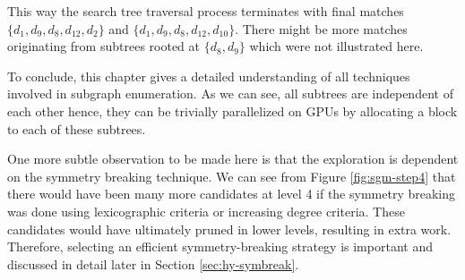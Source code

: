 This way the search tree traversal process terminates with final matches
$\{d_1, d_9, d_8, d_{12}, d_2\}$ and $\{d_1, d_9, d_8, d_{12}, d_{10}\}$.
There might be more matches originating from subtrees rooted at $\{d_8, d_9\}$ which were not illustrated here.

To conclude, this chapter gives a detailed understanding of all techniques involved in subgraph enumeration. As we can see, all subtrees are independent of each other hence, they can be trivially parallelized on GPUs by allocating a block to each of these subtrees.

One more subtle observation to be made here is that the exploration is dependent on the symmetry breaking technique.
We can see from Figure \ref{fig:sgm-step4} that there would have been many more candidates at level 4 if the symmetry breaking was done using lexicographic criteria or increasing degree criteria.
These candidates would have ultimately pruned in lower levels, resulting in extra work.
Therefore, selecting an efficient symmetry-breaking strategy is important and discussed in detail later in Section \ref{sec:hy-symbreak}.
